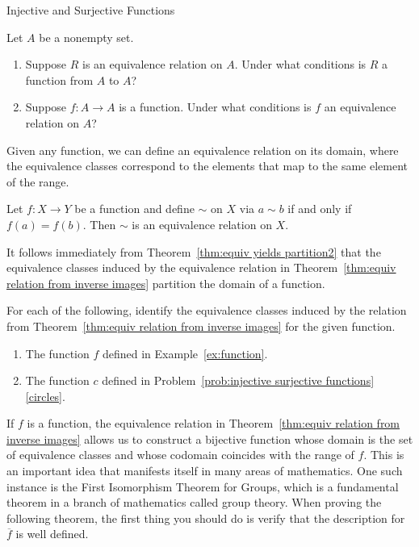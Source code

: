 \begin{section}{Injective and Surjective Functions}
\begin{problem}
Let $A$ be a nonempty set.
\begin{enumerate}[label=\textrm{(\alph*)}]
\item Suppose $R$ is an equivalence relation on $A$. Under what conditions is $R$ a function from $A$ to $A$?
\item Suppose $f:A\to A$ is a function. Under what conditions is $f$ an equivalence relation on $A$?
\end{enumerate}
\end{problem}

Given any function, we can define an equivalence relation on its domain, where the equivalence classes correspond to the elements that map to the same element of the range.

\begin{theorem}\label{thm:equiv relation from inverse images}
Let $f:X\to Y$ be a function and define $\sim$ on $X$ via $a\sim b$ if and only if $f(a) = f(b)$. Then $\sim$ is an equivalence relation on $X$.
\end{theorem}

It follows immediately from Theorem~\ref{thm:equiv yields partition2} that the equivalence classes induced by the equivalence relation in Theorem~\ref{thm:equiv relation from inverse images} partition the domain of a function.

\begin{problem}\label{prob:equiv classes from inverse images}
For each of the following, identify the equivalence classes induced by the relation from Theorem~\ref{thm:equiv relation from inverse images} for the given function.
\begin{enumerate}[label=\textrm{(\alph*)}]
\item The function $f$ defined in Example~\ref{ex:function}.
\item The function $c$ defined in Problem~\ref{prob:injective surjective functions}\ref{circles}.
\end{enumerate}
\end{problem}

If $f$ is a function, the equivalence relation in Theorem~\ref{thm:equiv relation from inverse images} allows us to construct a bijective function whose domain is the set of equivalence classes and whose codomain coincides with the range of $f$.  This is an important idea that manifests itself in many areas of mathematics.  One such instance is the First Isomorphism Theorem for Groups, which is a fundamental theorem in a branch of mathematics called group theory.  When proving the following theorem, the first thing you should do is verify that the description for $\overline{f}$ is well defined.


\end{section}
